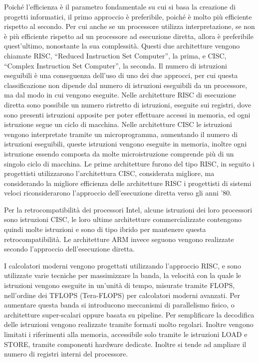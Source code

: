 \documentclass{article}
\numberwithin{equation}{subsection}
\begin{document}
Poiché l'efficienza è il parametro fondamentale su cui si basa la creazione di progetti informatici, il primo approccio è preferibile, poiché è molto più efficiente rispetto 
al secondo. Per cui anche se un processore utilizza interpretazione, se non è più efficiente rispetto ad un processore ad esecuzione diretta, allora è preferibile 
quest'ultimo, nonostante la sua complessità. Questi due architetture vengono chiamate RISC, ``Reduced Instruction Set Computer'', la prima, e CISC, ``Complex Instruction Set Computer'', 
la seconda. Il numero di istruzioni eseguibili è una conseguenza dell'uso di uno dei due approcci, per cui questa classificazione non dipende dal numero di istruzioni eseguibili 
da un processore, ma dal modo in cui vengono eseguite. 
Nelle architetture RISC di esecuzione diretta sono possibile un numero ristretto di istruzioni, eseguite sui registri, dove sono presenti istruzioni apposite per poter 
effettuare accessi in memoria, ed ogni istruzione segue un ciclo di macchina. 
Nelle architetture CISC le istruzioni vengono interpretate tramite un microprogramma, aumentando il numero di istruzioni eseguibili, queste istruzioni vengono eseguite 
in memoria, inoltre ogni istruzione essendo composta da molte microistruzione comprende più di un singolo ciclo di macchina. 
Le prime architetture furono del tipo RISC, in seguito i progettisti utilizzarono l'architettura CISC, considerata migliore, ma considerando la migliore efficienza delle 
architetture RISC i progettisti di sistemi veloci riconsiderarono l'approccio dell'esecuzione diretta verso gli anni '80. 

Per la retrocompatibilità dei processori Intel, alcune istruzioni dei loro processori sono istruzioni CISC, le loro ultime architetture commercializzate contengono quindi 
molte istruzioni e sono di tipo ibrido per mantenere questa retrocompatibilità. 
Le architetture ARM invece seguono vengono realizzate secondo l'approccio dell'esecuzione diretta. 

I calcolatori moderni vengono progettati utilizzando l'approccio RISC, e sono utilizzate varie tecniche per massimizzare la banda, la velocità con la quale le istruzioni 
vengono eseguite in un'unità di tempo, misurate tramite FLOPS, nell'ordine dei TFLOPS (Tera-FLOPS) per calcolatori moderni avanzati. Per aumentare questa banda si introducono 
meccanismi di parallelismo fisico, o architetture super-scalari oppure basata su pipeline. Per semplificare la decodifica delle istruzioni vengono realizzate tramite formati 
molto regolari. Inoltre vengono limitati i riferimenti alla memoria, accessibile solo tramite le istruzioni LOAD e STORE, tramite componenti hardware dedicate. Inoltre si tende 
ad ampliare il numero di registri interni del processore. 
\end{document}
